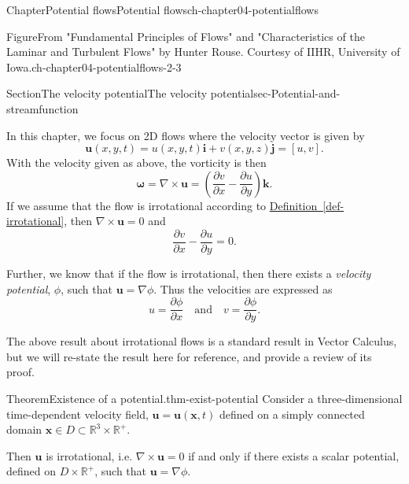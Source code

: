 \documentclass[oneside,10pt,]{book}
\newcommand{\xreffont}{\relax}
\numberwithin{equation}{section}
\newcommand{\pd}[2]{\frac{\partial#1}{\partial#2}}
\newcommand{\bx}{\boldsymbol{x}}
\newcommand{\bu}{\boldsymbol{u}}
\newcommand{\bomega}{\boldsymbol{\omega}}
\newcommand{\bi}{\boldsymbol{i}}
\newcommand{\bj}{\boldsymbol{j}}
\newcommand{\bk}{\boldsymbol{k}}
\begin{document}
\begin{chapterptx}{Chapter}{Potential flows}{}{Potential flows}{}{}{ch-chapter04-potentialflows}
\begin{introduction}{}
\begin{figureptx}{Figure}{From "Fundamental Principles of Flows" and "Characteristics of the Laminar and Turbulent Flows" by Hunter Rouse. Courtesy of IIHR, University of Iowa.}{ch-chapter04-potentialflows-2-3}{}
\begin{sidebyside}{2}{0.075}{0.075}{0.17}
\end{sidebyside}%
\tcblower
\end{figureptx}%
\end{introduction}%
%
%
\typeout{************************************************}
\typeout{************************************************}
%
\begin{sectionptx}{Section}{The velocity potential}{}{The velocity potential}{}{}{sec-Potential-and-streamfunction}
\begin{introduction}{}%
In this chapter, we focus on 2D flows where the velocity vector is given by%
\begin{equation*}
\bu(x, y, t) = u(x, y, t)\bi + v(x, y, z)\bj = [u, v].
\end{equation*}
With the velocity given as above, the vorticity is then%
\begin{equation}
\bomega = \nabla \times \bu = \left(\pd{v}{x} - \pd{u}{y}\right)\bk.\label{eqn-2d-vorticity}
\end{equation}
If we assume that the flow is irrotational according to \hyperref[def-irrotational]{Definition~{\xreffont\ref{def-irrotational}}}, then \(\nabla \times \bu = 0\) and%
\begin{equation}
\pd{v}{x} - \pd{u}{y} = 0.\label{eqn-2d-irrotational}
\end{equation}
%
\par
Further, we know that if the flow is irrotational, then there exists a \emph{velocity potential}, \(\phi\), such that \(\bu = \nabla \phi\). Thus the velocities are expressed as%
\begin{equation}
u = \pd{\phi}{x} \quad \textrm{and} \quad v = \pd{\phi}{y}.\label{eqn-vel-potential}
\end{equation}
%
\par
The above result about irrotational flows is a standard result in Vector Calculus, but we will re-state the result here for reference, and provide a review of its proof.%
\begin{theorem}{Theorem}{Existence of a potential.}{}{thm-exist-potential}%
Consider a three-dimensional time-dependent velocity field, \(\bu = \bu(\bx, t)\) defined on a simply connected domain \(\bx\in D \subset \mathbb{R}^3 \times \mathbb{R}^+.\)%
\par
Then \(\bu\) is irrotational, i.e. \(\nabla \times \bu = 0\) if and only if there exists a scalar potential, defined on \(D \times \mathbb{R}^+\), such that \(\bu = \nabla \phi\).%
\end{theorem}

\end{introduction}
\end{sectionptx}
\end{chapterptx}
\end{document}
